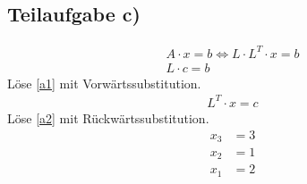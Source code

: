 \subsection*{Teilaufgabe c)}

\begin{align}
	A \cdot x = b \Leftrightarrow L \cdot L^T \cdot x = b \\
	L \cdot c = b \label{a1}
\end{align}
Löse \ref{a1} mit Vorwärtssubstitution.
\begin{align}
	L^T \cdot x = c \label{a2}
\end{align}
Löse \ref{a2} mit Rückwärtssubstitution.
\begin{align}
	x_3 &= 3 \\
	x_2 &= 1 \\
	x_1 &= 2
\end{align}
